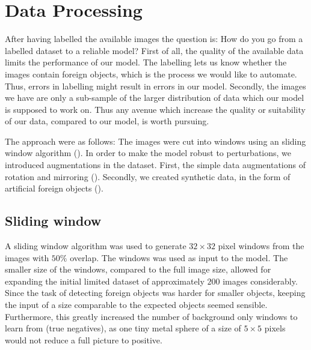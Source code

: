 \chapter{Data Processing}
\label{chap:dataprocs}
After having labelled the available images the question is: How do you go from a labelled dataset to a reliable model? 
First of all, the quality of the available data limits the performance of our model.
The labelling lets us know whether the images contain foreign objects, which is the process we would like to automate.
Thus, errors in labelling might result in errors in our model.
Secondly, the images we have are only a sub-sample of the larger distribution of data which our model is supposed to work on.
Thus any avenue which increase the quality or suitability of our data, compared to our model, is worth pursuing.

The approach were as follows: The images were cut into windows using an sliding window algorithm (). 
In order to make the model robust to perturbations, we introduced augmentations in the dataset.
First, the simple data augmentations of rotation and mirroring ().
Secondly, we created synthetic data, in the form of artificial foreign objects ().
\section{Sliding window}
\label{sec:slidingwindow}
A sliding window algorithm was used to generate $32 \times 32$ pixel windows from the images with $50\%$ overlap.
The windows was used as input to the model.
The smaller size of the windows, compared to the full image size, allowed for expanding the initial limited dataset of approximately $200$ images considerably. 
Since the task of detecting foreign objects was harder for smaller objects, keeping the input of a size comparable to the expected objects seemed sensible. 
Furthermore, this greatly increased the number of background only windows to learn from (true negatives), as one tiny metal sphere of a size of $5 \times 5$ pixels would not reduce a full picture to positive. 

